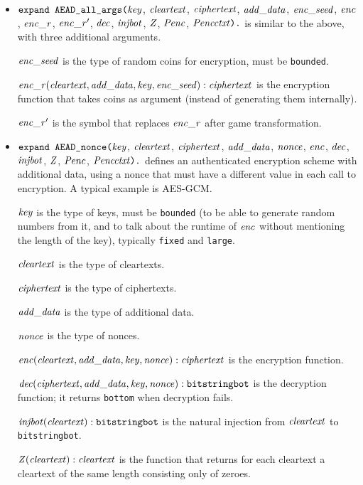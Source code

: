\documentclass{article}
\begin{document}
\begin{itemize}
\item $\texttt{expand AEAD\_all\_args(}\mathit{key}$,
$  \mathit{cleartext}$, $\mathit{ciphertext}$, $\mathit{add\_data}$, $\mathit{enc\_seed}$, $\mathit{enc}$, $\mathit{enc\_r}$, $\mathit{enc\_r}'$,
$  \mathit{dec}$, $\mathit{injbot}$, $\mathit{Z}$, $\mathit{Penc}$, $\mathit{Pencctxt}\texttt{).}$ is similar to the above,
  with three additional arguments. 

  $\mathit{enc\_seed}$ is the type of random coins for encryption, must be \texttt{bounded}.

  $\mathit{enc\_r}(\mathit{cleartext}, \mathit{add\_data}, \mathit{key}, \mathit{enc\_seed}): \mathit{ciphertext}$ is the encryption function that takes coins as argument (instead of generating them internally).

  $\mathit{enc\_r}'$ is the symbol that replaces $\mathit{enc\_r}$ after game transformation.


\item $\texttt{expand AEAD\_nonce(}\mathit{key}$,
$  \mathit{cleartext}$, $\mathit{ciphertext}$, $\mathit{add\_data}$, $\mathit{nonce}$, $\mathit{enc}$,
$  \mathit{dec}$, $\mathit{injbot}$, $\mathit{Z}$, $\mathit{Penc}$, $\mathit{Pencctxt}\texttt{).}$ defines an
authenticated encryption scheme with additional data, using a nonce that must have a different
value in each call to encryption. A typical example is AES-GCM.

   $\mathit{key}$ is the type of keys, must be \texttt{bounded} (to be able to generate random numbers from it, and to talk about the runtime of $\mathit{enc}$ without mentioning the length of the key), typically \texttt{fixed} and \texttt{large}.

   $\mathit{cleartext}$ is the type of cleartexts.

   $\mathit{ciphertext}$ is the type of ciphertexts.

   $\mathit{add\_data}$ is the type of additional data.

   $\mathit{nonce}$ is the type of nonces.

   $\mathit{enc}(\mathit{cleartext}, \mathit{add\_data}, \mathit{key}, \mathit{nonce}): \mathit{ciphertext}$ is the encryption function. 

   $\mathit{dec}(\mathit{ciphertext}, \mathit{add\_data}, \mathit{key}, \mathit{nonce}): \texttt{bitstringbot}$ is the
  decryption function; it returns \texttt{bottom} when decryption
  fails.

   $\mathit{injbot}(\mathit{cleartext}): \texttt{bitstringbot}$ is the natural
  injection from $\mathit{cleartext}$ to \texttt{bitstringbot}.

   $\mathit{Z}(\mathit{cleartext}): \mathit{cleartext}$ is the function that
  returns for each cleartext a cleartext of the same length consisting
  only of zeroes.


\end{itemize}
\end{document}
